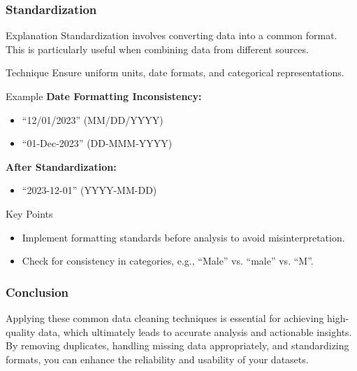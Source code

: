 \documentclass{beamer}
\begin{document}
\begin{frame}[fragile]
    \frametitle{Standardization}
    \begin{block}{Explanation}
        Standardization involves converting data into a common format. This is particularly useful when combining data from different sources.
    \end{block}
    
    \begin{block}{Technique}
        Ensure uniform units, date formats, and categorical representations.
    \end{block}
    
    \begin{block}{Example}
        \textbf{Date Formatting Inconsistency:}
        \begin{itemize}
            \item ``12/01/2023'' (MM/DD/YYYY)
            \item ``01-Dec-2023'' (DD-MMM-YYYY)
        \end{itemize}

        \textbf{After Standardization:}
        \begin{itemize}
            \item ``2023-12-01'' (YYYY-MM-DD)
        \end{itemize}
    \end{block}
    
    \begin{block}{Key Points}
        \begin{itemize}
            \item Implement formatting standards before analysis to avoid misinterpretation.
            \item Check for consistency in categories, e.g., ``Male'' vs. ``male'' vs. ``M''.
        \end{itemize}
    \end{block}
\end{frame}

\begin{frame}[fragile]
    \frametitle{Conclusion}
    Applying these common data cleaning techniques is essential for achieving high-quality data, which ultimately leads to accurate analysis and actionable insights. By removing duplicates, handling missing data appropriately, and standardizing formats, you can enhance the reliability and usability of your datasets.
\end{frame}
\end{document}

